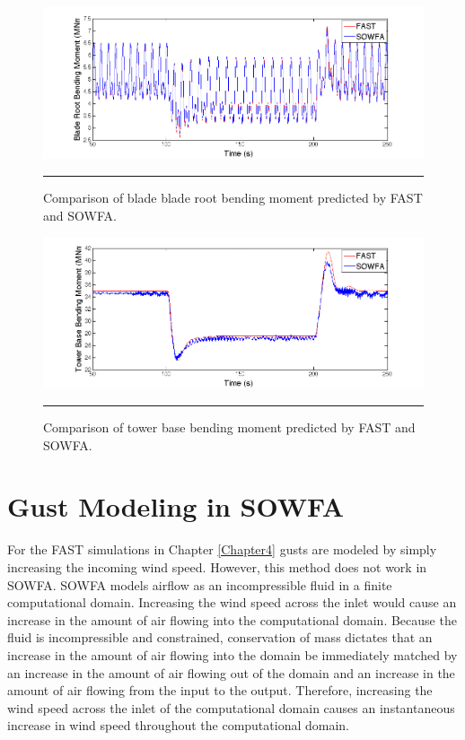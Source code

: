 \begin{figure}[htbp]
	\centering
		\includegraphics[trim = {1cm 0 2cm 0}, clip, width = \linewidth]{Figures/ch6Figures/fig6-5.png}
		\rule{35em}{0.5pt}
	\caption{Comparison of blade blade root bending moment predicted by FAST and SOWFA.}
	\label{fig6-5}
\end{figure}

\begin{figure}[htbp]
	\centering
		\includegraphics[trim = {1cm 0 2cm 0}, clip, width = \linewidth]{Figures/ch6Figures/fig6-6.png}
		\rule{35em}{0.5pt}
	\caption{Comparison of tower base bending moment predicted by FAST and SOWFA.}
	\label{fig6-6}
\end{figure}


\section{Gust Modeling in SOWFA} \label{section6-5}

For the FAST simulations in Chapter \ref{Chapter4} gusts are modeled by simply increasing the incoming wind speed. However, this method does not work in SOWFA. SOWFA models airflow as an incompressible fluid in a finite computational domain. Increasing the wind speed across the inlet would cause an increase in the amount of air flowing into the computational domain. Because the fluid is incompressible and constrained, conservation of mass dictates that an increase in the amount of air flowing into the domain be immediately matched by an increase in the amount of air flowing out of the domain and an increase in the amount of air flowing from the input to the output. Therefore, increasing the wind speed across the inlet of the computational domain causes an instantaneous increase in wind speed throughout the computational domain.

